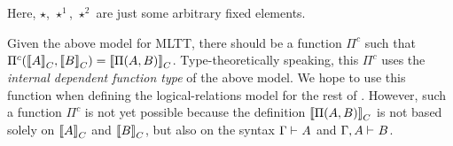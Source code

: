 \newcommand{\Glued}[1]{\ensuremath{{#1}^\bullet}}
\newcommand{\GluedPi}[2]{\ensuremath{\Pi^\bullet({#1},{#2})}}
\newcommand{\GSubstExt}[2]{\ensuremath{{#1},^\bullet{#2}}}
\newcommand{\Gpair}[2]{\ensuremath{({#1},^\bullet{#2})}}
\newcommand{\Gfst}[1]{\ensuremath{\texttt{fst}^\bullet~{#1}}}
\newcommand{\Gsnd}[1]{\ensuremath{\texttt{snd}^\bullet~{#1}}}
\newcommand{\Gsub}[2]{\ensuremath{{#1}\!\left[{#2}\right]^\bullet}}
\newcommand{\Glam}[1]{\ensuremath{\lambda^\bullet({#1})}}
\newcommand{\Gapp}[1]{\ensuremath{\texttt{app}^\bullet({#1})}}
\newcommand{\GSubstWeak}[1]{\ensuremath{(\texttt{p}^\bullet)^{#1}}}
\newcommand{\GLSigAdd}[3]{\ensuremath{\nu^{+\bullet}({#1},{#2},{#3})}}
\newcommand{\GCaseSig}[3]{\ensuremath{\texttt{CaseTy}^\bullet({#1},{#2},{#3})}}
\newcommand{\Gmodel}[1]{\ensuremath{{({#1})}^c}}
\newcommand{\GEl}[1]{\ensuremath{\Glued{\texttt{El}}({#1})}}
\newcommand{\Gwcode}[1]{\ensuremath{\Glued{\texttt{W}}({#1})}}
\newcommand{\GSubstId}{\ensuremath{\Glued{"id"}}}
\newcommand{\Gwsigproj}[3]{\ensuremath{\Glued{{\texttt{w}\pi^{#1}_{\texttt{#2}}}}({#3})}}
\newcommand{\GRecproj}[2]{\ensuremath{\Glued{{\texttt{R}\pi^{#1}}}({#2})}}



Here, $\star$, $\star^1$, $\star^2$ are just some arbitrary fixed elements.  


Given the above model for MLTT, there should be a function ${\Pi}^c$ such
that ${\Pi}^c({{\llbracket {A} \rrbracket}_C},{{\llbracket {B} \rrbracket}_C}) = {\llbracket {\ensuremath{\Pi({A},{B})}} \rrbracket}_C$. 
Type-theoretically speaking, this ${\Pi}^c$ uses the \emph{internal dependent
function type} of
the above model. We hope to
use this function when defining the logical-relations model for the rest of \TT.
However, such a function $\Pi^c$ is not yet possible because the definition
${\llbracket {\ensuremath{\Pi({A},{B})}} \rrbracket}_C$ is not based solely on ${\llbracket {A} \rrbracket}_C$ and
${\llbracket {B} \rrbracket}_C$,
but also on the syntax $ {\Gamma} \vdash_{} {A} $ and $ {\Gamma, A} \vdash_{} {B} $. 

